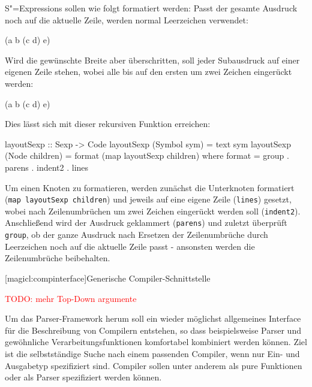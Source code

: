 \documentclass[12pt, a4paper, bibgerm]{scrbook}
\newenvironment{DIFnomarkup}{}{}
\newcommand\icode[1]{\lstinline?#1?}
\newcommand{\todo}[1]{
  \textcolor{red}{TODO: #1}
}
\newcommand\lsection{}
\newcommand{\sexps}{S"=Expressions}
\begin{document}
\sexps{} sollen wie folgt formatiert werden: Passt der gesamte Ausdruck
noch auf die aktuelle Zeile, werden normal Leerzeichen verwendet:
\begin{DIFnomarkup}\begin{code}
(a b (c d) e)
\end{code}\end{DIFnomarkup}
Wird die gewünschte Breite aber überschritten, soll jeder Subausdruck
auf einer eigenen Zeile stehen, wobei alle bis auf den ersten um zwei
Zeichen eingerückt werden:
\begin{DIFnomarkup}\begin{code}
(a
  b
  (c d)
  e)
\end{code}\end{DIFnomarkup}
Dies lässt sich mit dieser rekursiven Funktion erreichen:
\begin{DIFnomarkup}\begin{code}
layoutSexp :: Sexp -> Code
layoutSexp (Symbol sym)    = text sym
layoutSexp (Node children) = format (map layoutSexp children)
  where format = group . parens . indent2 . lines
\end{code}\end{DIFnomarkup} %

Um einen Knoten zu formatieren, werden zunächst die Unterknoten
formatiert \\ (\icode{map layoutSexp children}) und jeweils auf eine eigene
Zeile (\icode{lines}) gesetzt, wobei nach Zeilenumbrüchen um zwei
Zeichen eingerückt werden soll (\icode{indent2}). Anschließend wird
der Ausdruck geklammert (\icode{parens}) und zuletzt überprüft
\icode{group}, ob der ganze Ausdruck nach Ersetzen der Zeilenumbrüche
durch Leerzeichen noch auf die aktuelle Zeile passt - ansonsten werden
die Zeilenumbrüche beibehalten.

\lsection[magicl:compinterface]{Generische Compiler-Schnittstelle}

\todo{mehr Top-Down argumente}

Um das Parser-Framework herum soll ein wieder möglichst allgemeines
Interface für die Beschreibung von Compilern entstehen, so dass
beispielsweise Parser und gewöhnliche Verarbeitungsfunktionen
komfortabel kombiniert werden können. Ziel ist die selbstständige Suche
nach einem passenden Compiler, wenn nur Ein- und Ausgabetyp spezifiziert
sind. Compiler sollen unter anderem als pure Funktionen oder als Parser
spezifiziert werden können.
\end{document}

